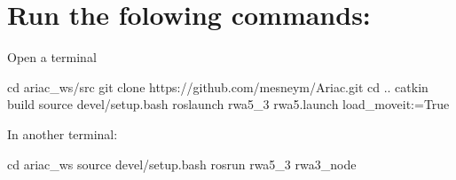 \section*{Run the folowing commands\+:}

Open a terminal 
\begin{DoxyCode}
cd ariac\_ws/src
git clone https://github.com/mesneym/Ariac.git
cd ..
catkin build
source devel/setup.bash
roslaunch rwa5\_3 rwa5.launch load\_moveit:=True
\end{DoxyCode}


In another terminal\+: 
\begin{DoxyCode}
cd ariac\_ws
source devel/setup.bash
rosrun rwa5\_3 rwa3\_node
\end{DoxyCode}
 